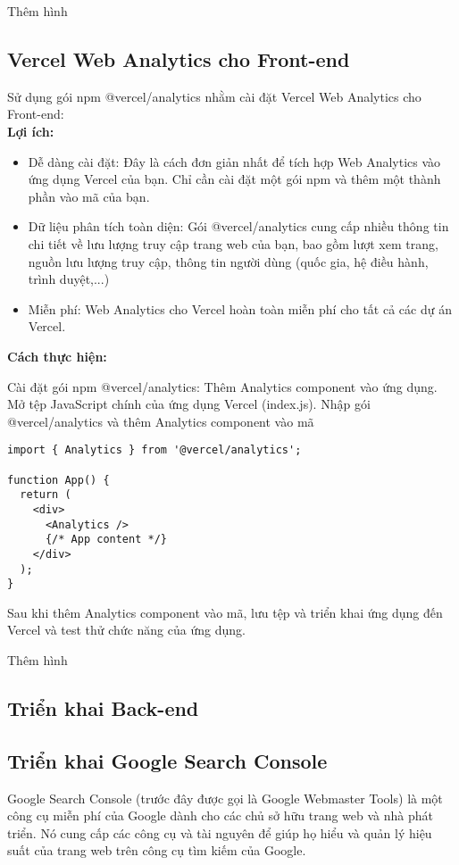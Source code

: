 Thêm hình 



\subsection{Vercel Web Analytics cho Front-end}
Sử dụng gói npm @vercel/analytics nhằm cài đặt Vercel Web Analytics cho Front-end:\\

\textbf{Lợi ích:}

\begin{itemize}
    \item Dễ dàng cài đặt: Đây là cách đơn giản nhất để tích hợp Web Analytics vào ứng dụng Vercel của bạn. Chỉ cần cài đặt một gói npm và thêm một thành phần vào mã của bạn.
    \item Dữ liệu phân tích toàn diện: Gói @vercel/analytics cung cấp nhiều thông tin chi tiết về lưu lượng truy cập trang web của bạn, bao gồm lượt xem trang, nguồn lưu lượng truy cập, thông tin người dùng (quốc gia, hệ điều hành, trình duyệt,...)
    \item Miễn phí: Web Analytics cho Vercel hoàn toàn miễn phí cho tất cả các dự án Vercel.
\end{itemize}

\textbf{Cách thực hiện:}

Cài đặt gói npm @vercel/analytics:
Thêm Analytics component vào ứng dụng. Mở tệp JavaScript chính của ứng dụng Vercel (index.js). Nhập gói @vercel/analytics và thêm Analytics component vào mã
\begin{lstlisting}
import { Analytics } from '@vercel/analytics';

function App() {
  return (
    <div>
      <Analytics />
      {/* App content */}
    </div>
  );
}
\end{lstlisting}

Sau khi thêm Analytics component vào mã, lưu tệp và triển khai ứng dụng đến Vercel và test thử chức năng của ứng dụng.

Thêm hình

\subsection{Triển khai Back-end}

\subsection{Triển khai Google Search Console}
Google Search Console (trước đây được gọi là Google Webmaster Tools) là một công cụ miễn phí của Google dành cho các chủ sở hữu trang web và nhà phát triển. Nó cung cấp các công cụ và tài nguyên để giúp họ hiểu và quản lý hiệu suất của trang web trên công cụ tìm kiếm của Google.\\


